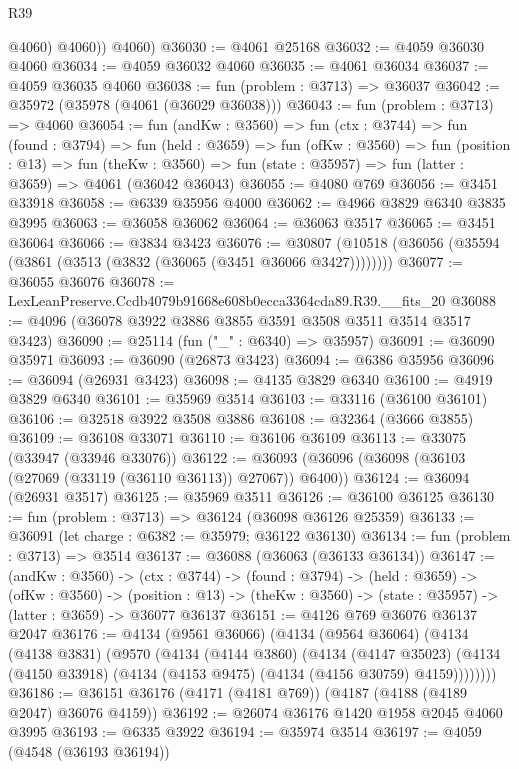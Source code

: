 \begin{lexlean}{R39}
\begin{coremodule}
            @4060)
          @4060))
      @4060)
@36030 := @4061 @25168
@36032 := @4059 @36030 @4060
@36034 := @4059 @36032 @4060
@36035 := @4061 @36034
@36037 := @4059 @36035 @4060
@36038 := fun (problem : @3713) => @36037
@36042 := @35972 (@35978 (@4061 (@36029 @36038)))
@36043 := fun (problem : @3713) => @4060
@36054 := fun (andKw : @3560) =>
  fun (ctx : @3744) =>
  fun (found : @3794) =>
  fun (held : @3659) =>
  fun (ofKw : @3560) =>
  fun (position : @13) =>
  fun (theKw : @3560) => fun (state : @35957) => fun (latter : @3659) => @4061 (@36042 @36043)
@36055 := @4080 @769
@36056 := @3451 @33918
@36058 := @6339 @35956 @4000
@36062 := @4966 @3829 @6340 @3835 @3995
@36063 := @36058 @36062
@36064 := @36063 @3517
@36065 := @3451 @36064
@36066 := @3834 @3423
@36076 := @30807 (@10518 (@36056 (@35594 (@3861 (@3513 (@3832 (@36065 (@3451 @36066 @3427))))))))
@36077 := @36055 @36076
@36078 := LexLeanPreserve.Ccdb4079b91668e608b0ecca3364cda89.R39.__fits_20
@36088 := @4096 (@36078 @3922 @3886 @3855 @3591 @3508 @3511 @3514 @3517 @3423)
@36090 := @25114 (fun ("_" : @6340) => @35957)
@36091 := @36090 @35971
@36093 := @36090 (@26873 @3423)
@36094 := @6386 @35956
@36096 := @36094 (@26931 @3423)
@36098 := @4135 @3829 @6340
@36100 := @4919 @3829 @6340
@36101 := @35969 @3514
@36103 := @33116 (@36100 @36101)
@36106 := @32518 @3922 @3508 @3886
@36108 := @32364 (@3666 @3855)
@36109 := @36108 @33071
@36110 := @36106 @36109
@36113 := @33075 (@33947 (@33946 @33076))
@36122 := @36093 (@36096 (@36098 (@36103 (@27069 (@33119 (@36110 @36113)) @27067)) @6400))
@36124 := @36094 (@26931 @3517)
@36125 := @35969 @3511
@36126 := @36100 @36125
@36130 := fun (problem : @3713) => @36124 (@36098 @36126 @25359)
@36133 := @36091 (let charge : @6382 := @35979; @36122 @36130)
@36134 := fun (problem : @3713) => @3514
@36137 := @36088 (@36063 (@36133 @36134))
@36147 := (andKw : @3560) ->
  (ctx : @3744) ->
  (found : @3794) ->
  (held : @3659) ->
  (ofKw : @3560) ->
  (position : @13) -> (theKw : @3560) -> (state : @35957) -> (latter : @3659) -> @36077 @36137
@36151 := @4126 @769 @36076 @36137 @2047
@36176 := @4134
    (@9561 @36066)
    (@4134
      (@9564 @36064)
      (@4134
        (@4138 @3831)
        (@9570
          (@4134
            (@4144 @3860)
            (@4134
              (@4147 @35023)
              (@4134 (@4150 @33918) (@4134 (@4153 @9475) (@4134 (@4156 @30759) @4159))))))))
@36186 := @36151 @36176 (@4171 (@4181 @769)) (@4187 (@4188 (@4189 @2047) @36076 @4159))
@36192 := @26074 @36176 @1420 @1958 @2045 @4060 @3995
@36193 := @6335 @3922
@36194 := @35974 @3514
@36197 := @4059 (@4548 (@36193 @36194))

\end{coremodule}
\end{lexlean}
